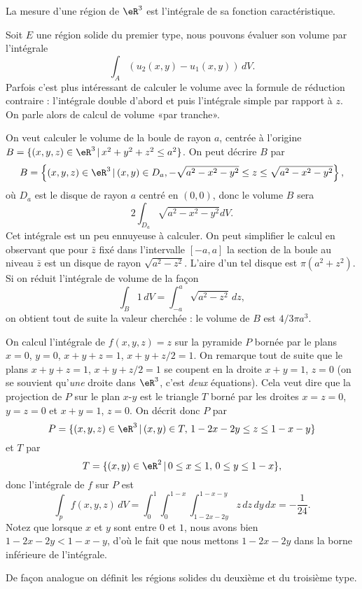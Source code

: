 \begin{definition}
   La mesure d'une région de  $\eR^3$ est l'intégrale de sa fonction caractéristique. 
\end{definition}
Soit $E$ une région solide du premier type, nous pouvons évaluer son volume par l'intégrale
\[
\int_A\left(u_2(x,y)-u_1(x,y)\right)\, dV.
\]  
Parfois c'est plus intéressant de calculer le volume avec la formule de réduction contraire : l'intégrale double d'abord et puis l'intégrale simple par rapport à $z$. On parle alors de calcul de volume «par tranche».
\begin{example}
On veut calculer le volume de la boule de rayon $a$, centrée à l'origine $B=\{(x,y,z)\in\eR^3\,\vert\, x^2+y^2+z^2\leq a^2 \}$. On peut décrire $B$ par
\[
  B=\left\{(x,y,z)\in\eR^3\,\vert\, (x,y)\in D_a, -\sqrt{a^2-x^2-y^2}\leq z\leq \sqrt{a^2-x^2-y^2}  \right\},
\]
où $D_a$ est le disque de rayon $a$ centré en $(0,0)$, donc le volume $B$ sera
\[
2 \int_{D_a}\sqrt{a^2-x^2-y^2} dV.
\] 
Cet intégrale est un peu ennuyeuse à calculer. On peut simplifier le calcul en observant que pour $\bar z$ fixé dans l'intervalle $[-a,a]$ la section de la boule au niveau $\bar z$ est un disque de rayon $\sqrt{a^2-z^2}$. L'aire d'un tel disque est  $\pi (a^2+z^2)$. Si on réduit l'intégrale de volume de la façon
\[
\int_{B} 1\, dV=\int_{-a}^{a}  \sqrt{a^2-z^2}\, dz,
\] 
on obtient tout de suite la valeur cherchée : le volume de $B$ est $4/3 \pi a^3$.   
\end{example}
\begin{example}
	On calcul l'intégrale de $f(x,y,z)=z$ sur la pyramide $P$ bornée par le plans $x=0$, $y=0$, $x+y+z=1$, $x+y+z/2=1$. On remarque tout de suite que le plans $x+y+z=1$, $x+y+z/2=1$ se coupent en la droite $x+y=1$, $z=0$ (on se souvient qu'\emph{une} droite dans $\eR^3$, c'est \emph{deux} équations). Cela veut dire que la projection de $P$ sur le plan $x$-$y$ est le  triangle $T$ borné par les droites $x=z=0$, $y=z=0$ et $x+y=1$, $z=0$.  
On  décrit donc $P$ par
\[
P=\{(x,y,z)\in\eR^3\,\vert\, (x,y)\in T, \, 1-2x-2y\leq z\leq 1-x-y\}
\] 
et $T$ par 
\[
T=\{(x,y)\in\eR^2\,\vert\, 0\leq x\leq 1,\,  0\leq y\leq 1-x\},
\]
donc l'intégrale de $f$ sur $P$ est 
\[
\int_pf(x,y,z)\, dV= \int_{0}^{1}\int_{0}^{1-x}\int_{1-2x-2y}^{1-x-y}z \,dz\,dy\,dx=-\frac{1}{ 24 }.
\]
Notez que lorsque $x$ et $y$ sont entre $0$ et $1$, nous avons bien $1-2x-2y<1-x-y$, d'où le fait que nous mettons $1-2x-2y$ dans la borne inférieure de l'intégrale.
\end{example}
De façon analogue on définit les régions solides du deuxième et du troisième type.  
